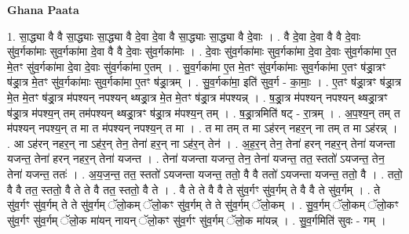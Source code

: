 \documentclass[17pt]{extarticle}
\begin{document}
\textbf{Ghana Paata } \newline

1. सा॒द्ध्या वै वै सा॒द्ध्याः सा॒द्ध्या वै दे॒वा दे॒वा वै सा॒द्ध्याः सा॒द्ध्या वै दे॒वाः । . वै दे॒वा दे॒वा वै वै दे॒वाः सु॑व॒र्गका॑माः सुव॒र्गका॑मा दे॒वा वै वै दे॒वाः सु॑व॒र्गका॑माः । . दे॒वाः सु॑व॒र्गका॑माः सुव॒र्गका॑मा दे॒वा दे॒वाः सु॑व॒र्गका॑मा ए॒त मे॒तꣳ सु॑व॒र्गका॑मा दे॒वा दे॒वाः सु॑व॒र्गका॑मा ए॒तम् । . सु॒व॒र्गका॑मा ए॒त मे॒तꣳ सु॑व॒र्गका॑माः सुव॒र्गका॑मा ए॒तꣳ ष॑ड्रा॒त्रꣳ ष॑ड्रा॒त्र मे॒तꣳ सु॑व॒र्गका॑माः सुव॒र्गका॑मा ए॒तꣳ ष॑ड्रा॒त्रम् । . सु॒व॒र्गका॑मा॒ इति॑ सुव॒र्ग - का॒माः॒ । . ए॒तꣳ ष॑ड्रा॒त्रꣳ ष॑ड्रा॒त्र मे॒त मे॒तꣳ ष॑ड्रा॒त्र म॑पश्यन् नपश्यन् थ्षड्रा॒त्र मे॒त मे॒तꣳ ष॑ड्रा॒त्र म॑पश्यन्न् । . ष॒ड्रा॒त्र म॑पश्यन् नपश्यन् थ्षड्रा॒त्रꣳ ष॑ड्रा॒त्र म॑पश्य॒न् तम् तम॑पश्यन् थ्षड्रा॒त्रꣳ ष॑ड्रा॒त्र म॑पश्य॒न् तम् । . ष॒ड्रा॒त्रमिति॑ षट् - रा॒त्रम् । . अ॒प॒श्य॒न् तम् त म॑पश्यन् नपश्य॒न् त मा त म॑पश्यन् नपश्य॒न् त मा । . त मा तम् त मा ऽह॑रन् नहर॒न् ना तम् त मा ऽह॑रन्न् । . आ ऽह॑रन् नहर॒न् ना ऽह॑र॒न् तेन॒ तेना॑ हर॒न् ना ऽह॑र॒न् तेन॑ । . अ॒ह॒र॒न् तेन॒ तेना॑ हरन् नहर॒न् तेना॑ यजन्ता यजन्त॒ तेना॑ हरन् नहर॒न् तेना॑ यजन्त । . तेना॑ यजन्ता यजन्त॒ तेन॒ तेना॑ यजन्त॒ तत॒ स्ततो॑ ऽयजन्त॒ तेन॒ तेना॑ यजन्त॒ ततः॑ । . अ॒य॒ज॒न्त॒ तत॒ स्ततो॑ ऽयजन्ता यजन्त॒ ततो॒ वै वै ततो॑ ऽयजन्ता यजन्त॒ ततो॒ वै । . ततो॒ वै वै तत॒ स्ततो॒ वै ते ते वै तत॒ स्ततो॒ वै ते । . वै ते ते वै वै ते सु॑व॒र्गꣳ सु॑व॒र्गम् ते वै वै ते सु॑व॒र्गम् । . ते सु॑व॒र्गꣳ सु॑व॒र्गम् ते ते सु॑व॒र्गम् ॅलो॒कम् ॅलो॒कꣳ सु॑व॒र्गम् ते ते सु॑व॒र्गम् ॅलो॒कम् । . सु॒व॒र्गम् ॅलो॒कम् ॅलो॒कꣳ सु॑व॒र्गꣳ सु॑व॒र्गम् ॅलो॒क मा॑यन् नायन् ॅलो॒कꣳ सु॑व॒र्गꣳ सु॑व॒र्गम् ॅलो॒क मा॑यन्न् । . सु॒व॒र्गमिति॑ सुवः - गम् । \newline
\end{document}

